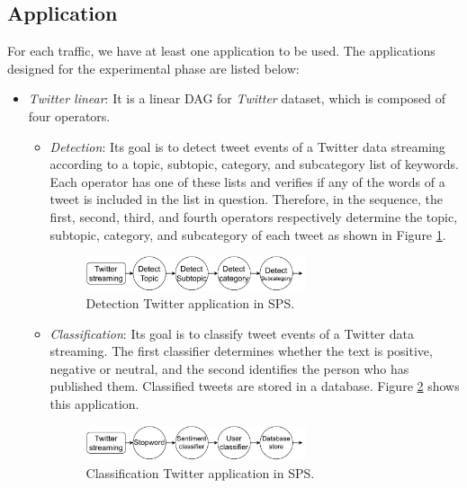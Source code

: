 \subsection{Application}
\label{exp:app}
For each traffic, we have at least one application to be used. The applications designed for the experimental phase are listed below:

\begin{itemize}
\item \textit{Twitter linear}: It is a linear DAG for \textit{Twitter} dataset, which is composed of four operators.

\begin{itemize}
	\item \textit{Detection}: Its goal is to detect tweet events of a Twitter data streaming according to a topic, subtopic, category, and subcategory list of keywords. Each operator has one of these lists and verifies if any of the words of a tweet is included in the list in question. Therefore, in the sequence, the first, second, third, and fourth operators respectively determine the topic, subtopic, category, and subcategory of each tweet as shown in Figure \ref{fig:app-twitter-linear-1}.
	
\begin{figure}[!ht]
\centering
    \includegraphics[width=0.65\textwidth]{figures/exp/App-Twitter-Linear-1.pdf}
    \caption{Detection Twitter application in SPS.}
    \label{fig:app-twitter-linear-1}
\end{figure}	
	
	\item \textit{Classification}: Its goal is to classify tweet events of a Twitter data streaming. The first classifier determines whether the text is positive, negative or neutral, and the second identifies the person who has published them. Classified tweets are stored in a database. Figure \ref{fig:app-twitter-linear-2} shows this application.
\begin{figure}[!ht]
\centering
    \includegraphics[width=0.65\textwidth]{figures/exp/App-Twitter-Linear-2.pdf}
    \caption{Classification Twitter application in SPS.}
    \label{fig:app-twitter-linear-2}
\end{figure}			
\end{itemize}


\end{itemize}
